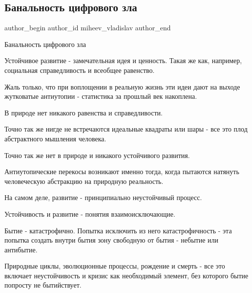 
 
 
 
 
 
\subsection{Банальность цифрового зла}
\label{sec:14_10_2021.fb.miheev_vladislav.1.banalnost_cifrovogo_zla}
 
\ifcmt
 author_begin
   author_id miheev_vladislav
 author_end
\fi

Банальность цифрового зла

Устойчивое развитие - замечательная идея и ценность. Такая же как, например,
социальная справедливость и всеобщее равенство. 

Жаль только, что при воплощении в реальную жизнь эти идеи дают на выходе
жутковатые антиутопии  - статистика за прошлый век накоплена.

В природе нет никакого равенства и справедливости.

 Точно так же нигде не встречаются идеальные квадраты или шары - все это плод
 абстрактного мышления человека. 

Точно так же нет в природе и никакого устойчивого развития.

Антиутопические перекосы возникают именно тогда, когда пытаются натянуть
человеческую абстракцию на природную реальность.

На самом деле, развитие - принципиально неустойчивый процесс. 

Устойчивость и развитие - понятия взаимоисключающие.

Бытие - катастрофично. Попытка исключить из него катастрофичность - эта попытка
создать внутри бытия зону свободную  от бытия - небытие или антибытие.

Природные циклы, эволюционные процессы, рождение и смерть - все  это включает
неустойчивость и кризис как необходимый элемент, без которого бытие попросту не
бытийствует.

